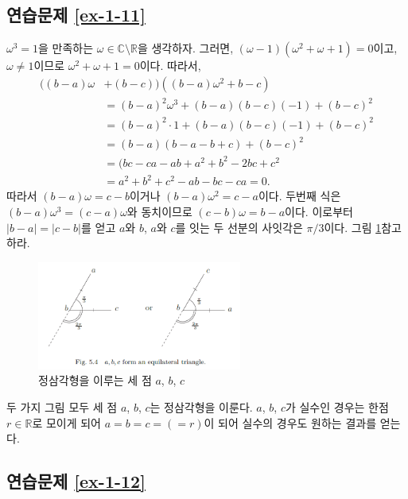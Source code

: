 \subsection*{연습문제 \ref{ex-1-11}}

$\omega^3=1$을 만족하는 $\omega\in\mathbb C \setminus \mathbb R$을 생각하자.
그러면, $(\omega-1)(\omega^2+\omega+1)=0$이고,
$\omega\ne1$이므로 $\omega^2+\omega+1=0$이다.
따라서,
\begin{align*}
((b-a)\omega &+(b-c))((b-a)\omega^2+b-c) \\
&= (b-a)^2\omega^3 + (b-a)(b-c)(-1) + (b-c)^2 \\
&= (b-a)^2\cdot 1 + (b-a)(b-c)(-1)  + (b-c)^2 \\
&= (b-a)(b-a-b+c) + (b-c)^2 \\
&=(bc-ca-ab+a^2+b^2-2bc+c^2 \\
&= a^2+b^2+c^2 -ab - bc - ca = 0.
\end{align*}
따라서 $(b-a)\omega = c-b$이거나 $(b-a)\omega^2 = c-a$이다.
두번째 식은 $(b-a)\omega^3 = (c-a)\omega$와 동치이므로
$(c-b)\omega = b-a$이다.
이로부터 $|b-a|=|c-b|$를 얻고
$a$와 $b$, $a$와 $c$를 잇는 두 선분의 사잇각은 $\pi/3$이다.
그림 \ref{fig-5-4}\를 참고하라.

\begin{figure}[h!]
\begin{center}
\includegraphics[width=0.6\textwidth]{./Solution/figs/fig-5-4}
\end{center}
\caption{정삼각형을 이루는 세 점 $a$, $b$, $c$}
\label{fig-5-4}
\end{figure}

두 가지 그림 모두 세 점 $a$, $b$, $c$는 정삼각형을 이룬다.
 $a$, $b$, $c$가 실수인 경우는 한점 $r\in\mathbb R$로 모이게 되어
 $a=b=c=(=r)$이 되어 실수의 경우도 원하는 결과를 얻는다.

\subsection*{연습문제 \ref{ex-1-12}}

